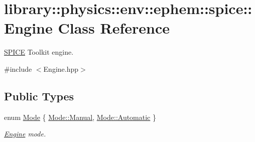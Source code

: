 \hypertarget{classlibrary_1_1physics_1_1env_1_1ephem_1_1spice_1_1_engine}{}\section{library\+:\+:physics\+:\+:env\+:\+:ephem\+:\+:spice\+:\+:Engine Class Reference}
\label{classlibrary_1_1physics_1_1env_1_1ephem_1_1spice_1_1_engine}


\hyperlink{classlibrary_1_1physics_1_1env_1_1ephem_1_1_s_p_i_c_e}{S\+P\+I\+CE} Toolkit engine.  




{\ttfamily \#include $<$Engine.\+hpp$>$}

\subsection*{Public Types}
\begin{DoxyCompactItemize}
\item 
enum \hyperlink{classlibrary_1_1physics_1_1env_1_1ephem_1_1spice_1_1_engine_a2d185a63bce354bff9ad38810410eab4}{Mode} \{ \hyperlink{classlibrary_1_1physics_1_1env_1_1ephem_1_1spice_1_1_engine_a2d185a63bce354bff9ad38810410eab4ae1ba155a9f2e8c3be94020eef32a0301}{Mode\+::\+Manual}, 
\hyperlink{classlibrary_1_1physics_1_1env_1_1ephem_1_1spice_1_1_engine_a2d185a63bce354bff9ad38810410eab4a086247a9b57fde6eefee2a0c4752242d}{Mode\+::\+Automatic}
 \}\begin{DoxyCompactList}\small\item\em \hyperlink{classlibrary_1_1physics_1_1env_1_1ephem_1_1spice_1_1_engine}{Engine} mode. \end{DoxyCompactList}
\end{DoxyCompactItemize}
